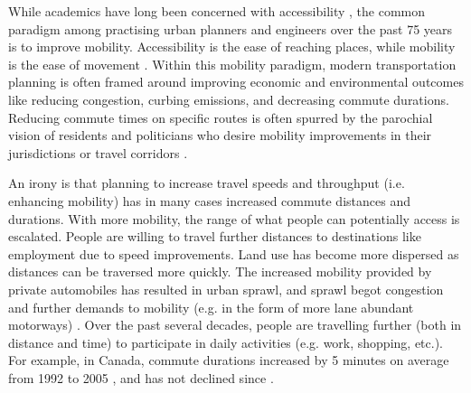 \documentclass[11 pt, letterpaper]{article}
\begin{document}
{While academics have long been concerned with accessibility \cite{hansen1959}, the common paradigm among practising urban planners and engineers over the past 75 years is to improve mobility. Accessibility is the ease of reaching places, while mobility is the ease of movement \cite{cervero1997}. Within this mobility paradigm, modern transportation planning is often framed around improving economic and environmental outcomes like reducing congestion, curbing emissions, and decreasing commute durations. Reducing commute times on specific routes is often spurred by the parochial vision of residents and politicians who desire mobility improvements in their jurisdictions or travel corridors \cite{knight2004}. 

An irony is that planning to increase travel speeds and throughput (i.e. enhancing mobility) has in many cases increased commute distances and durations. With more mobility, the range of what people can potentially access is escalated.
People are willing to travel further distances to destinations like employment due to speed improvements. Land use has become more dispersed as distances can be traversed more quickly. The increased mobility provided by private automobiles has resulted in urban sprawl, and sprawl begot congestion and further demands to mobility (e.g. in the form of more lane abundant motorways) \cite{hanson2004}. Over the past several decades, people are travelling further (both in distance and time) to participate in daily activities (e.g. work, shopping, etc.). For example, in Canada, commute durations increased by 5 minutes on average from 1992 to 2005 \cite{turcotte2005}, and has not declined since \cite{sc2015}. 

}
\end{document}
